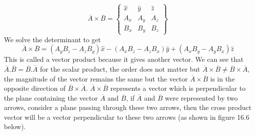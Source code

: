 \begin{dmath*}
\overline{A} \times \overline{B} = 
\begin{Bmatrix}
\hat{x} & \hat{y} & \hat{z}\\
A_{x} & A_{y} & A_{z} \\
B_{x} & B_{y} & B_{z} 
\end{Bmatrix}
\end{dmath*}
We solve the determinant to get 
\begin{dmath}
\overline{A} \times \overline{B} = (A_{y}B_{z} - A_{z}B_{y})\hat{x} - (A_{x}B_{z} - A_{z}B_{x})\hat{y} + (A_{x}B_{y} - A_{y}B_{x})\hat{z}
\end{dmath}
This is called a vector product because it gives another vector. We can see that $\overline{A}.\overline{B} = \overline{B}.\overline{A} $ for the scalar product, the order does not matter but $\overline{A} \times \overline{B} \neq \overline{B} \times \overline{A}$, the magnitude of the vector remains the same but the vector $\overline{A} \times \overline{B}$ is in the opposite direction of $\overline{B} \times \overline{A}$. $\overline{A} \times \overline{B}$ represents a vector which is perpendicular to the plane containing the vector $\overline{A}$ and $\overline{B}$, if $\overline{A}$ and $\overline{B}$ were represented by two arrows, consider a plane passing through these two arrows, then the cross product vector will be a vector perpendicular to these two arrows (as shown in figure 16.6 below).


